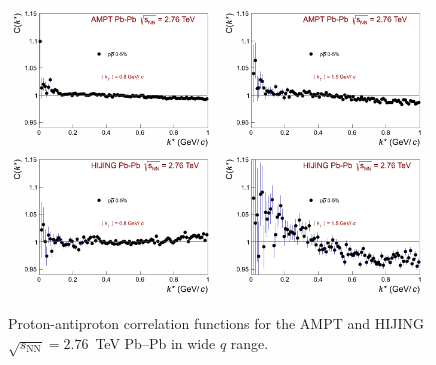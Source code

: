 \begin{figure}%
  \centering
  \includegraphics[width=0.49\textwidth]{papnfampt}
  \includegraphics[width=0.49\textwidth]{papnf2ampt}
  \includegraphics[width=0.49\textwidth]{papnfhijing}
  \includegraphics[width=0.49\textwidth]{papnf2hijing}
  \caption{Proton-antiproton correlation functions for the AMPT and HIJING $\sqrt{s_{\mathrm{NN}}}=2.76$~TeV Pb--Pb in wide $q$ range.}
  \label{nonflatmc}
\end{figure}

